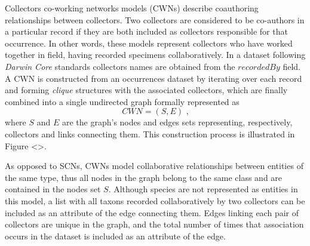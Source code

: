 

Collectors co-working networks models (CWNs) describe coauthoring relationships between collectors. Two collectors are considered to be co-authors in a particular record if they are both included as collectors responsible for that occurrence. In other words, these models represent collectors who have worked together in field, having recorded specimens collaboratively.
In a dataset following \textit{Darwin Core} standards collectors names are obtained from the $recordedBy$ field.
A CWN is constructed from an occurrences dataset by iterating over each record and forming \textit{clique} structures with the associated collectors, which are finally combined into a single undirected graph formally represented as 
$$CWN = (S,E) \mbox{ ,}$$
where $S$ and $E$ are the graph's nodes and edges sets representing, respectively, collectors and links connecting them. This construction process is illustrated in Figure <>. %

As opposed to SCNs, CWNs model collaborative relationships between entities of the same type, thus all nodes in the graph belong to the same class and are contained in the nodes set $S$. 
Although species are not represented as entities in this model, a list with all taxons recorded collaboratively by two collectors can be included as an attribute of the edge connecting them. 
Edges linking each pair of collectors are unique in the graph, and the total number of times that association occurs in the dataset is included as an attribute of the edge.


